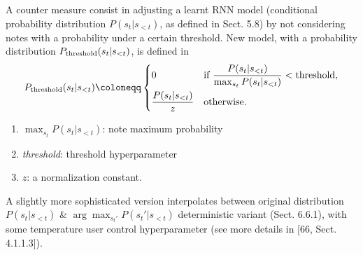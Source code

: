 \documentclass{article}
\begin{document}
\begin{itemize}
\begin{itemize}
\begin{itemize}
\begin{itemize}
				A counter measure consist in adjusting a learnt RNN model (conditional probability distribution $P(s_t|s_{< t})$, as defined in Sect. 5.8) by not considering notes with a probability under a certain threshold. New model, with a probability distribution $P_{\rm threshold}(s_t|s_{< t})$, is defined in
				\begin{equation*}
					P_{\rm threshold}(s_t|s_{< t})\coloneqq\left\{\begin{split}
						&0&&\mbox{if }\frac{P(s_t|s_{< t})}{\max_{s_t} P(s_t|s_{< t})} < {\rm threshold},\\
						&\frac{P(s_t|s_{< t})}{z}&&\mbox{otherwise}.
					\end{split}\right.
				\end{equation*}
				\begin{enumerate}
					\item $\max_{s_t} P(s_t|s_{< t})$: note maximum probability
					\item {\it threshold}: threshold hyperparameter
					\item $z$: a normalization constant.
				\end{enumerate}
				A slightly more sophisticated version interpolates between original distribution $P(s_t|s_{<t})$ \& $\arg\max_{s_t'} P(s_t'|s_{<t})$ deterministic variant (Sect. 6.6.1), with some temperature user control hyperparameter (see more details in [66, Sect. 4.1.1.3]).


\end{itemize}
\end{itemize}
\end{itemize}
\end{itemize}
\end{document}
